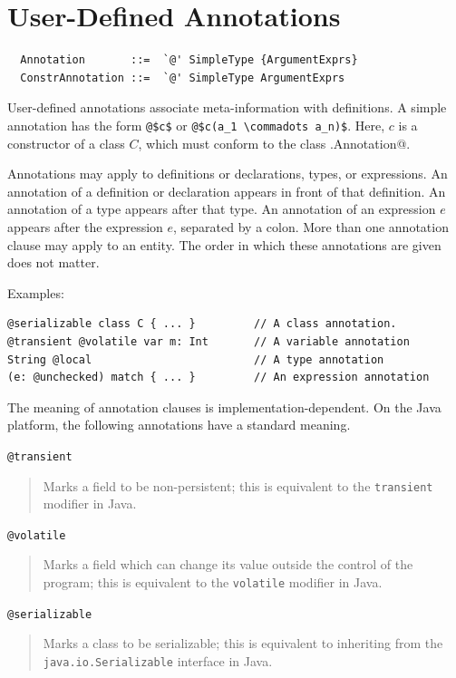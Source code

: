 \chapter{User-Defined Annotations}
\label{sec:annotations}

\syntax\begin{lstlisting}
  Annotation       ::=  `@' SimpleType {ArgumentExprs}
  ConstrAnnotation ::=  `@' SimpleType ArgumentExprs
\end{lstlisting}

User-defined annotations associate meta-information with definitions.
A simple annotation has the form \lstinline^@$c$^ or
\lstinline^@$c(a_1 \commadots a_n)$^.  
Here, $c$ is a constructor of a class $C$, which must conform
to the class \lstinline@scala.Annotation@. 

Annotations may apply to definitions or declarations, types, or
expressions.  An annotation of a definition or declaration appears in
front of that definition.  An annotation of a type appears after
that type. An annotation of an expression $e$ appears after the
expression $e$, separated by a colon. More than one annotation clause
may apply to an entity. The order in which these annotations are given
does not matter.

Examples:
\begin{lstlisting}
@serializable class C { ... }         // A class annotation.
@transient @volatile var m: Int       // A variable annotation
String @local                         // A type annotation
(e: @unchecked) match { ... }         // An expression annotation
\end{lstlisting}

The meaning of annotation clauses is implementation-dependent. On the
Java platform, the following annotations have a standard meaning.\bigskip

\lstinline^@transient^
\begin{quote}
Marks a field to be non-persistent; this is
equivalent to the \lstinline^transient^
modifier in Java.
\end{quote}

\lstinline^@volatile^
\begin{quote}Marks a field which can change its value
outside the control of the program; this
is equivalent to the \lstinline^volatile^
modifier in Java.
\end{quote}

\lstinline^@serializable^
\begin{quote}Marks a class to be serializable; this is
equivalent to inheriting from the 
\lstinline^java.io.Serializable^ interface
in Java.
\end{quote}


